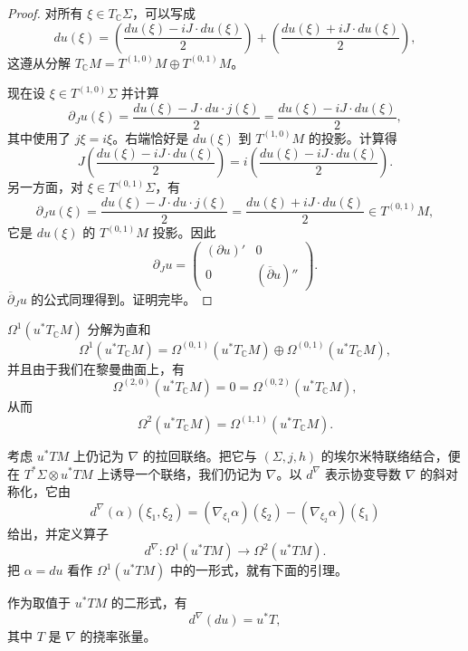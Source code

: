 \begin{proof}
对所有 $\xi\in T_{\mathbb C}\Sigma$，可以写成
\[
 du(\xi)=
 \left(\frac{du(\xi)-iJ\cdot du(\xi)}2\right)
 +\left(\frac{du(\xi)+iJ\cdot du(\xi)}2\right),
\]
这遵从分解 $T_{\mathbb C}M=T^{(1,0)}M\oplus T^{(0,1)}M$。

现在设 $\xi\in T^{(1,0)}\Sigma$ 并计算
\begin{equation}
 \partial_Ju(\xi)
 =\frac{du(\xi)-J\cdot du\cdot j(\xi)}2
 =\frac{du(\xi)-iJ\cdot du(\xi)}2,
 \label{eq:partial-j-u-one-zero-vector}
\end{equation}
其中使用了 $j\xi=i\xi$。右端恰好是 $du(\xi)$ 到 $T^{(1,0)}M$ 的投影。计算得
\[
 J\left(\frac{du(\xi)-iJ\cdot du(\xi)}2\right)
 =i\left(\frac{du(\xi)-iJ\cdot du(\xi)}2\right).
\]
另一方面，对 $\xi\in T^{(0,1)}\Sigma$，有
\[
 \partial_Ju(\xi)
 =\frac{du(\xi)-J\cdot du\cdot j(\xi)}2
 =\frac{du(\xi)+iJ\cdot du(\xi)}2\in T^{(0,1)}M,
\]
它是 $du(\xi)$ 的 $T^{(0,1)}M$ 投影。因此
\[
 \partial_Ju=
 \begin{pmatrix}(\partial u)'&0\\0&(\overline\partial u)''\end{pmatrix}.
\]
$\overline\partial_Ju$ 的公式同理得到。证明完毕。
\end{proof}

$\Omega^1(u^*T_{\mathbb C}M)$ 分解为直和
\[
 \Omega^1(u^*T_{\mathbb C}M)
 =\Omega^{(0,1)}(u^*T_{\mathbb C}M)
 \oplus\Omega^{(0,1)}(u^*T_{\mathbb C}M),
\]
并且由于我们在黎曼曲面上，有
\[
 \Omega^{(2,0)}(u^*T_{\mathbb C}M)=0
 =\Omega^{(0,2)}(u^*T_{\mathbb C}M),
\]
从而
\[
 \Omega^2(u^*T_{\mathbb C}M)=\Omega^{(1,1)}(u^*T_{\mathbb C}M).
\]

考虑 $u^*TM$ 上仍记为 $\nabla$ 的拉回联络。把它与 $(\Sigma,j,h)$ 的埃尔米特联络结合，便在 $T^*\Sigma\otimes u^*TM$ 上诱导一个联络，我们仍记为 $\nabla$。以 $d^\nabla$ 表示协变导数 $\nabla$ 的斜对称化，它由
\[
 d^\nabla(\alpha)(\xi_1,\xi_2)
 =(\nabla_{\xi_1}\alpha)(\xi_2)
 -(\nabla_{\xi_2}\alpha)(\xi_1)
\]
给出，并定义算子
\[
 d^\nabla:\Omega^1(u^*TM)\longrightarrow\Omega^2(u^*TM).
\]
把 $\alpha=du$ 看作 $\Omega^1(u^*TM)$ 中的一形式，就有下面的引理。

\begin{lemma}\label{lem:covariant-exterior-derivative-du-torsion}
作为取值于 $u^*TM$ 的二形式，有
\begin{equation}
 d^\nabla(du)=u^*T,
 \label{eq:d-nabla-du-pullback-torsion}
\end{equation}
其中 $T$ 是 $\nabla$ 的挠率张量。
\end{lemma}

